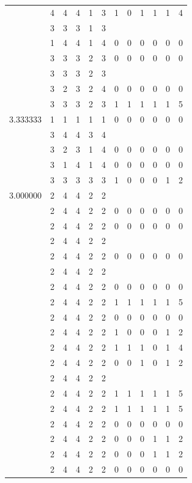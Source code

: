 \documentclass[]{book}
\theoremstyle{definition}
\theoremstyle{definition}
\theoremstyle{definition}
\theoremstyle{remark}
\begin{document}
\begin{table}
{\begin{tabular}[t]{rrrrrrrrrrrr}
 & 4 & 4 & 4 & 1 & 3 & 1 & 0 & 1 & 1 & 1 & 4\\
 & 3 & 3 & 3 & 1 & 3 &  &  &  &  &  & \\
 & 1 & 4 & 4 & 1 & 4 & 0 & 0 & 0 & 0 & 0 & 0\\
 & 3 & 3 & 3 & 2 & 3 & 0 & 0 & 0 & 0 & 0 & 0\\
 & 3 & 3 & 3 & 2 & 3 &  &  &  &  &  & \\
 & 3 & 2 & 3 & 2 & 4 & 0 & 0 & 0 & 0 & 0 & 0\\
 & 3 & 3 & 3 & 2 & 3 & 1 & 1 & 1 & 1 & 1 & 5\\
3.333333 & 1 & 1 & 1 & 1 & 1 & 0 & 0 & 0 & 0 & 0 & 0\\
 & 3 & 4 & 4 & 3 & 4 &  &  &  &  &  & \\
 & 3 & 2 & 3 & 1 & 4 & 0 & 0 & 0 & 0 & 0 & 0\\
 & 3 & 1 & 4 & 1 & 4 & 0 & 0 & 0 & 0 & 0 & 0\\
 & 3 & 3 & 3 & 3 & 3 & 1 & 0 & 0 & 0 & 1 & 2\\
3.000000 & 2 & 4 & 4 & 2 & 2 &  &  &  &  &  & \\
 & 2 & 4 & 4 & 2 & 2 & 0 & 0 & 0 & 0 & 0 & 0\\
 & 2 & 4 & 4 & 2 & 2 & 0 & 0 & 0 & 0 & 0 & 0\\
 & 2 & 4 & 4 & 2 & 2 &  &  &  &  &  & \\
 & 2 & 4 & 4 & 2 & 2 & 0 & 0 & 0 & 0 & 0 & 0\\
 & 2 & 4 & 4 & 2 & 2 &  &  &  &  &  & \\
 & 2 & 4 & 4 & 2 & 2 & 0 & 0 & 0 & 0 & 0 & 0\\
 & 2 & 4 & 4 & 2 & 2 & 1 & 1 & 1 & 1 & 1 & 5\\
 & 2 & 4 & 4 & 2 & 2 & 0 & 0 & 0 & 0 & 0 & 0\\
 & 2 & 4 & 4 & 2 & 2 & 1 & 0 & 0 & 0 & 1 & 2\\
 & 2 & 4 & 4 & 2 & 2 & 1 & 1 & 1 & 0 & 1 & 4\\
 & 2 & 4 & 4 & 2 & 2 & 0 & 0 & 1 & 0 & 1 & 2\\
 & 2 & 4 & 4 & 2 & 2 &  &  &  &  &  & \\
 & 2 & 4 & 4 & 2 & 2 & 1 & 1 & 1 & 1 & 1 & 5\\
 & 2 & 4 & 4 & 2 & 2 & 1 & 1 & 1 & 1 & 1 & 5\\
 & 2 & 4 & 4 & 2 & 2 & 0 & 0 & 0 & 0 & 0 & 0\\
 & 2 & 4 & 4 & 2 & 2 & 0 & 0 & 0 & 1 & 1 & 2\\
 & 2 & 4 & 4 & 2 & 2 & 0 & 0 & 0 & 1 & 1 & 2\\
 & 2 & 4 & 4 & 2 & 2 & 0 & 0 & 0 & 0 & 0 & 0\\

\end{tabular}}
\end{table}
\end{document}
